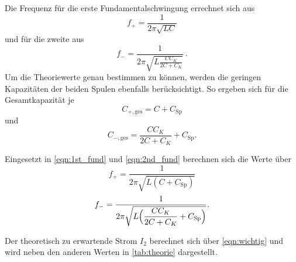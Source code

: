 Die Frequenz für die erste Fundamentalschwingung errechnet sich aus 
\begin{equation}
    \label{eqn:1st_fund}
    f_+ = \frac{1}{2\pi\sqrt{LC}}
\end{equation}
und für die zweite aus
\begin{equation}
    \label{eqn:2nd_fund}
    f_- = \frac{1}{2\pi\sqrt{L\frac{CC_K}{2C+C_K}}}\:.
\end{equation}
Um die Theoriewerte genau bestimmen zu können, werden die geringen Kapazitäten der beiden Spulen ebenfalls berücksichtigt.
So ergeben sich für die Gesamtkapazität je 
\begin{equation} %
    C_{+, \text{ges}} = C + C_\text{Sp}
\end{equation}
und
\begin{equation}
    C_{-, \text{ges}} = \frac{CC_K}{2C+C_K} + C_\text{Sp}.
\end{equation}

Eingesetzt in \eqref{eqn:1st_fund} und \eqref{eqn:2nd_fund} berechnen sich die Werte über
\begin{equation}
    \label{eqn:1st_fund_Csp}
    f_+ = \frac{1}{2\pi\sqrt{L(C + C_\text{Sp})}}
\end{equation}
\begin{equation}
    \label{eqn:2nd_fund_Csp}
    f_- = \frac{1}{2\pi\sqrt{L\Bigl(\dfrac{CC_K}{2C+C_K} + C_\text{Sp}\Bigr)}}.
\end{equation}

Der theoretisch zu erwartende Strom $I_2$ berechnet sich über \eqref{eqn:wichtig} und wird neben den anderen Werten in \ref{tab:theorie} dargestellt.

